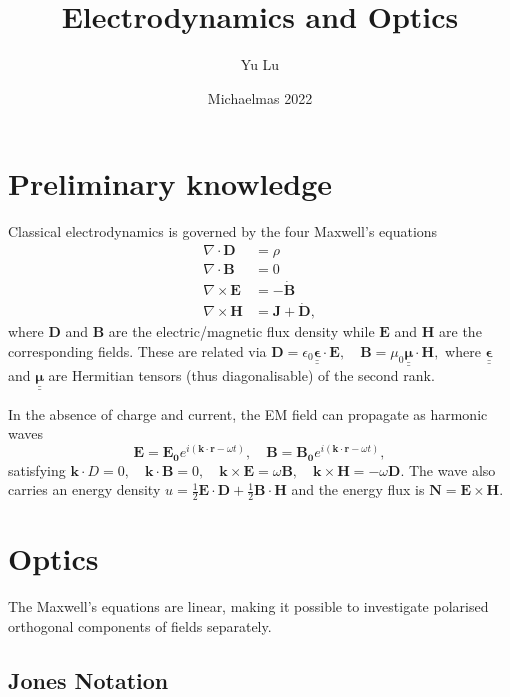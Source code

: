 \documentclass{article}
\title{Electrodynamics and Optics}
\date{Michaelmas 2022}
\author{Yu Lu}
\newcommand{\tn}[1]{\underline{\underline{\mathbf{#1}}}} %
\theoremstyle{nonumberplain}
\begin{document}
\maketitle
\section{Preliminary knowledge}
Classical electrodynamics is governed by the four Maxwell's equations
\begin{equation}    
    \begin{aligned}
        \nabla \cdot \mathbf{D} &= \rho  \\
        \nabla \cdot \mathbf{B} &= 0 \\
        \nabla \times \mathbf{E} &= -\dot{\mathbf{B} } \\ 
        \nabla \times \mathbf{H} &= \mathbf{J} + \dot{\mathbf{D} }, 
    \end{aligned}
\end{equation}
where $\mathbf{D}$ and $\mathbf{B} $ are the electric/magnetic flux density while $\mathbf{E} $ and $\mathbf{H} $ are the corresponding fields. These are related via 
\(
    \mathbf{D} = \epsilon_0 \tn{\epsilon } \cdot \mathbf{E}, 
\quad  \mathbf{B} = \mu_0 \tn{\mu} \cdot \mathbf{H}, 
\) 
where $\tn{\epsilon } $ and $\tn{\mu} $ are Hermitian tensors (thus diagonalisable) of the second rank. 

In the absence of charge and current, the EM field can propagate as harmonic waves
\[  
    \mathbf{E} = \mathbf{E_0} e^{i (\mathbf{k} \cdot \mathbf{r} - \omega  t)}, \quad 
    \mathbf{B} = \mathbf{B_0} e^{i (\mathbf{k} \cdot \mathbf{r} - \omega  t)},
    \] 
satisfying 
\(
    \mathbf{k} \cdot D = 0, \quad \mathbf{k} \cdot \mathbf{B} =0, \quad \mathbf{k} \times \mathbf{E} = \omega \mathbf{B} , \quad \mathbf{k} \times \mathbf{H} = - \omega \mathbf{D}. 
\) 
The wave also carries an energy density $u = \frac{1}{2} \mathbf{E} \cdot \mathbf{D} + \frac{1}{2} \mathbf{B} \cdot \mathbf{H} $ and the energy flux is $\mathbf{N} = \mathbf{E} \times  \mathbf{H}.$
\section{Optics}
The Maxwell's equations are linear, making it possible to investigate polarised orthogonal components of fields separately. 
\subsection{Jones Notation}
\end{document}
